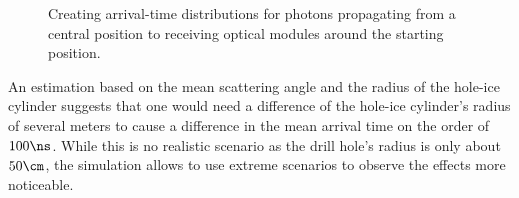 
\begin{figure}[htbp]
  \hfill
  \caption{Creating arrival-time distributions for photons propagating from a central position to receiving optical modules around the starting position.}
  \label{fig:eipau6Ag}
\end{figure}


An estimation based on the mean scattering angle and the radius of the hole-ice cylinder suggests that one would need a difference of the hole-ice cylinder's radius of several meters to cause a difference in the mean arrival time on the order of $100\ns$. While this is no realistic scenario as the drill hole's radius is only about $50\cm$, the simulation allows to use extreme scenarios to observe the effects more noticeable.

